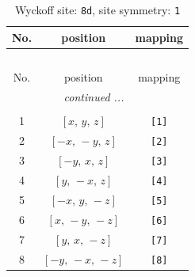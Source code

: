 \documentclass[fleqn,8pt]{jsarticle}
\begin{document}
\begin{longtable}{ccc}
\caption{Wyckoff site: {\tt 8d}, site symmetry: {\tt 1}}
 \\
 \hline \hline
No. & position & mapping \\ \hline \endfirsthead

\multicolumn{2}{l}{\tablename\ \thetable{}} \\
 \hline \hline
No. & position & mapping \\ \hline \endhead

 \hline \hline
\multicolumn{2}{r}{\footnotesize\it continued ...} \\ \endfoot

 \hline \hline
\multicolumn{2}{r}{} \\ \endlastfoot

1 & $\left[ x,\, y,\, z \right]$ & {\tt [1]} \\ \hline
2 & $\left[ - x,\, - y,\, z \right]$ & {\tt [2]} \\ \hline
3 & $\left[ - y,\, x,\, z \right]$ & {\tt [3]} \\ \hline
4 & $\left[ y,\, - x,\, z \right]$ & {\tt [4]} \\ \hline
5 & $\left[ - x,\, y,\, - z \right]$ & {\tt [5]} \\ \hline
6 & $\left[ x,\, - y,\, - z \right]$ & {\tt [6]} \\ \hline
7 & $\left[ y,\, x,\, - z \right]$ & {\tt [7]} \\ \hline
8 & $\left[ - y,\, - x,\, - z \right]$ & {\tt [8]} \\
\end{longtable}
\end{document}
